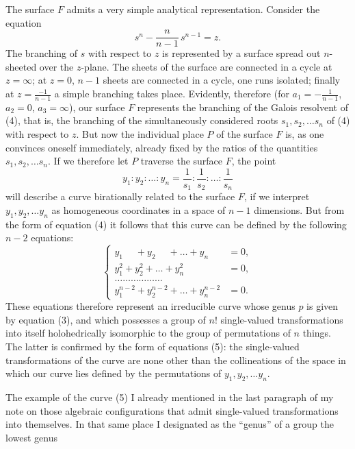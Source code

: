 \documentclass{article}
\begin{document}
The surface $F$ admits a very simple analytical representation. Consider the equation
\[
s^n - \frac{n}{n - 1}\,s^{n-1} = z.
\tag{4}
\]
The branching of $s$ with respect to $z$ is represented by a surface spread out $n$-sheeted over the $z$-plane. The sheets of the surface are connected in a cycle at $z = \infty$; at $z = 0$, $n - 1$ sheets are connected in a cycle, one runs isolated; finally at $z = \frac{-1}{n-1}$ a simple branching takes place. Evidently, therefore (for $a_1 = -\frac{1}{n-1}$, $a_2 = 0$, $a_3 = \infty$), our surface $F$ represents the branching of the Galois resolvent of (4), that is, the branching of the simultaneously considered roots $s_1, s_2, \dots s_n$ of (4) with respect to $z$. But now the individual place $P$ of the surface $F$ is, as one convinces oneself immediately, already fixed by the ratios of the quantities $s_1, s_2, \dots s_n$. If we therefore let $P$ traverse the surface $F$, the point
\[
y_1 : y_2 : \dots : y_n = \frac{1}{s_1} : \frac{1}{s_2} : \dots : \frac{1}{s_n}
\]
will describe a curve birationally related to the surface $F$, if we interpret $y_1, y_2, \dots y_n$ as homogeneous coordinates in a space of $n - 1$ dimensions. But from the form of equation (4) it follows that this curve can be defined by the following $n - 2$ equations:
\[
\left\{
\begin{aligned}
y_1^{\phantom{n-2}} + y_2^{\phantom{n-2}} + \dots + y_n^{\phantom{n-2}} &= 0, \\
y_1^2 + y_2^2 + \dots + y_n^2 &= 0, \\
\dots\dots\dots\dots\dots\dots & \\
y_1^{n-2} + y_2^{n-2} + \dots + y_n^{n-2} &= 0.
\end{aligned}
\right.
\tag{5}
\]
These equations therefore represent an irreducible curve whose genus $p$ is given by equation (3), and which possesses a group of $n!$ single-valued transformations into itself holohedrically isomorphic to the group of permutations of $n$ things. The latter is confirmed by the form of equations (5): the single-valued transformations of the curve are none other than the collineations of the space in which our curve lies defined by the permutations of $y_1, y_2, \dots y_n$.

The example of the curve (5) I already mentioned in the last paragraph of my note on those algebraic configurations that admit single-valued transformations into themselves. In that same place I designated as the ``genus'' of a group the lowest genus
\end{document}
